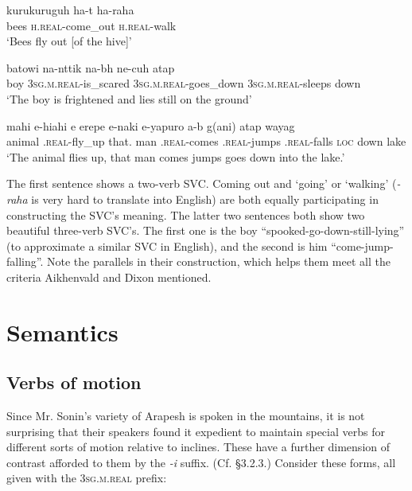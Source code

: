 \documentclass[pdftex,12pt,letterpaper]{article}
\let\ipa\textipa
\let\enya\textltailn
\def\sw{\ipa{\super w}}
\begin{document}
\begin{exe}
\ex\gll kurukuruguh h\sw a-t\ipa{@g1r} h\sw a-raha\ipa{\enya} \\
bees \textsc{h\sw.real}-come\_out \textsc{h\sw.real}-walk \\
\trans `Bees fly out [of the hive]'

\ex\gll batowi\ipa{\enya} na-n\ipa{@}t\ipa{1}tik na-b\ipa{@}h ne-cuh atap \\
boy \textsc{3sg.m.real}-is\_scared \textsc{3sg.m.real}-goes\_down \textsc{3sg.m.real}-sleeps down \\
\trans `The boy is frightened and lies still on the ground'

\ex\gll mahi\ipa{\enya} \ipa{\enya}e-hiahi e\ipa{\enya1nd@} erepe\ipa{\enya} \ipa{\enya}e-naki \ipa{\enya}e-yapuro \ipa{\enya}a-b\ipa{@h} g(ani) atap wayag \\
animal \textsc{\ipa{\enya}.real}-fly\_up that.\textsc{\ipa{\enya}} man \textsc{\ipa{\enya}.real}-comes \textsc{\ipa{\enya}.real}-jumps \textsc{\ipa{\enya}.real}-falls \textsc{loc} down lake\\
\trans `The animal flies up, that man comes jumps goes down into the lake.'
\end{exe}

The first sentence shows a two-verb SVC. Coming out and `going' or `walking' (\emph{-raha\ipa{\enya}} is very hard to translate into English) are both equally participating in constructing the SVC's meaning. The latter two sentences both show two beautiful three-verb SVC's. The first one is the boy ``spooked-go-down-still-lying'' (to approximate a similar SVC in English), and the second is him ``come-jump-falling''. Note the parallels in their construction, which helps them meet all the criteria Aikhenvald and Dixon mentioned.

\pagebreak
 \section{Semantics}

 \subsection{Verbs of motion}

Since Mr. Sonin's variety of Arapesh is spoken in the mountains, it is not surprising that their speakers found it expedient to maintain special verbs for different sorts of motion relative to inclines. These have a further dimension of contrast afforded to them by the \emph{-i} suffix. (Cf. \S 3.2.3.) Consider these forms, all given with the \textsc{3sg.m.real} prefix:
\end{document}
